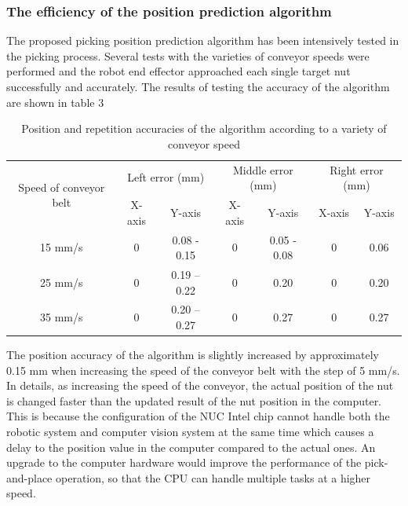 \documentclass[10pt, letterpaper]{article}
\begin{document}
\subsubsection*{The efficiency of the position prediction algorithm}
    The proposed picking position prediction algorithm has been intensively tested in the picking process. Several tests with the varieties of conveyor speeds were performed and the robot end effector approached each single target nut successfully and accurately. The results of testing the accuracy of the algorithm are shown in table 3\par
    \begin{table}[h!]
        \caption{Position and repetition accuracies of the algorithm according to a variety of conveyor speed}\label{table3}
        \centering
        \renewcommand{\arraystretch}{1.75}
        \setlength{\tabcolsep}{7pt}
        \begin{tabular}{ ccccccc }
        \hline
        \multirow{2}{1.5cm}{Speed of conveyor belt}  &
        \multicolumn{2}{c}{Left error (mm)} &
        \multicolumn{2}{c}{Middle error (mm)} &
        \multicolumn{2}{c}{Right error (mm)}\\ 
        \cline{2-7}
        & X-axis & Y-axis & X-axis & Y-axis & X-axis & Y-axis\\
        \hline
        15 mm/s & 0 & 0.08 - 0.15 & 0 & 0.05 - 0.08 & 0 & 0.06\\
        25 mm/s & 0 & 0.19 – 0.22 & 0 & 0.20 & 0 & 0.20\\
        35 mm/s & 0 & 0.20 – 0.27 & 0 & 0.27 & 0 & 0.27\\
        \hline
        \end{tabular}
    \end{table}
    The position accuracy of the algorithm is slightly increased by approximately 0.15 mm when increasing the speed of the conveyor belt with the step of 5 mm/s. In details, as increasing the speed of the conveyor, the actual position of the nut is changed faster than the updated result of the nut position in the computer. This is because the configuration of the NUC Intel chip cannot handle both the robotic system and computer vision system at the same time which causes a delay to the position value in the computer compared to the actual ones. An upgrade to the computer hardware would improve the performance of the pick-and-place operation, so that the CPU can handle multiple tasks at a higher speed.\par
\end{document}
